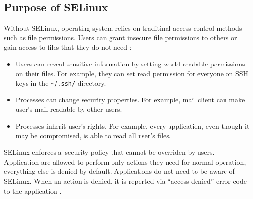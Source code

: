 \subsection{Purpose of SELinux}
Without SELinux, operating system relies on traditinal access control methods
such as file permissions. Users can grant insecure file permissions to others or
gain access to files that they do not need \cite{selinuxguide}:
\begin{itemize}
    \item Users can reveal sensitive information by setting world readable
        permissions on their files. For example, they can set read permission
        for everyone on SSH keys in the \texttt{\textasciitilde/.ssh/}
        directory.
    \item Processes can change security properties. For example, mail client can
        make user's mail readable by other users.
    \item Processes inherit user's rights. For example, every application, even
        though it may be compromised, is able to read all user's files.
\end{itemize}

SELinux enforces a~security policy that cannot be overriden by users.
Application are allowed to perform only actions they need for normal operation,
everything else is denied by default. Applications do not need to be aware of
SELinux. When an action is denied, it is reported via ``access denied'' error
code to the application \cite{centoshowto}.

%
%    
%
%

